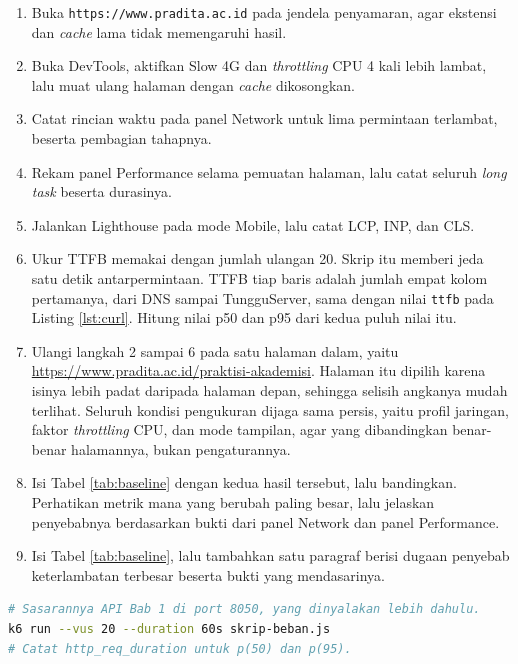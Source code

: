 \begin{enumerate}
  \item Buka \texttt{https://www.pradita.ac.id} pada jendela penyamaran, agar
        ekstensi dan \textit{cache} lama tidak memengaruhi hasil.
  \item Buka DevTools, aktifkan Slow 4G dan \textit{throttling} CPU 4 kali lebih lambat,
        lalu muat ulang halaman dengan \textit{cache} dikosongkan.
  \item Catat rincian waktu pada panel Network untuk lima permintaan terlambat,
        beserta pembagian tahapnya.
  \item Rekam panel Performance selama pemuatan halaman, lalu catat seluruh
        \textit{long task} beserta durasinya.
  \item Jalankan Lighthouse pada mode Mobile, lalu catat LCP, INP, dan CLS.
  \item Ukur TTFB memakai 
        dengan jumlah ulangan 20. Skrip itu memberi jeda satu detik
        antarpermintaan. TTFB tiap baris adalah jumlah empat kolom
        pertamanya, dari DNS sampai TungguServer, sama dengan nilai
        \texttt{ttfb} pada Listing \ref{lst:curl}. Hitung nilai p50 dan p95
        dari kedua puluh nilai itu.
  \item Ulangi langkah 2 sampai 6 pada satu halaman dalam, yaitu
        \url{https://www.pradita.ac.id/praktisi-akademisi}. Halaman itu dipilih
        karena isinya lebih padat daripada halaman depan, sehingga selisih
        angkanya mudah terlihat. Seluruh kondisi pengukuran dijaga sama persis,
        yaitu profil jaringan, faktor \textit{throttling} CPU, dan mode tampilan, agar
        yang dibandingkan benar-benar halamannya, bukan pengaturannya.
  \item Isi Tabel \ref{tab:baseline} dengan kedua hasil tersebut, lalu
        bandingkan. Perhatikan metrik mana yang berubah paling besar, lalu
        jelaskan penyebabnya berdasarkan bukti dari panel Network dan panel
        Performance.
  \item Isi Tabel \ref{tab:baseline}, lalu tambahkan satu paragraf berisi
        dugaan penyebab keterlambatan terbesar beserta bukti yang mendasarinya.
\end{enumerate}

\begin{lstlisting}[language=bash, caption={Uji beban dengan k6, tersedia di \berkas{sources/chapter02/skrip-beban.js}, hanya untuk sistem sendiri atau yang sudah berizin}, label={lst:k6}]
# Sasarannya API Bab 1 di port 8050, yang dinyalakan lebih dahulu.
k6 run --vus 20 --duration 60s skrip-beban.js
# Catat http_req_duration untuk p(50) dan p(95).
\end{lstlisting}

